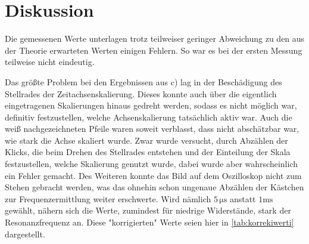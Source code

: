 \section{Diskussion}
\label{sec:Diskussion}

Die gemessenen Werte unterlagen trotz teilweiser geringer Abweichung zu den aus der Theorie erwarteten Werten einigen Fehlern.
So war es bei der ersten Messung teilweise nicht eindeutig.



Das größte Problem bei den Ergebnissen aus c) lag in der Beschädigung des Stellrades der Zeitachsenskalierung. Dieses konnte auch über die eigentlich eingetragenen Skalierungen hinaus gedreht werden, sodass es nicht
möglich war, definitiv festzustellen, welche Achsenskalierung tatsächlich aktiv war. Auch die weiß nachgezeichneten Pfeile waren soweit verblasst, dass nicht abschätzbar war, wie stark die Achse skaliert wurde. Zwar
wurde versucht, durch Abzählen der Klicks, die beim Drehen des Stellrades entstehen und der Einteilung der Skala festzustellen, welche Skalierung genutzt wurde, dabei wurde aber wahrscheinlich ein Fehler gemacht.
Des Weiteren konnte das Bild auf dem Oszilloskop nicht zum Stehen gebracht werden, was das ohnehin schon ungenaue Abzählen der Kästchen zur Frequenzermittlung weiter erschwerte.
Wird nämlich $5 \, \unit{\micro\second}$ anstatt $1 \unit{\milli\second}$ gewählt, nähern sich die Werte, zumindest für niedrige Widerstände, stark der Resonanzfrequenz an.
Diese "korrigierten" Werte seien hier in \autoref{tab:korrekiwerti} dargestellt.

